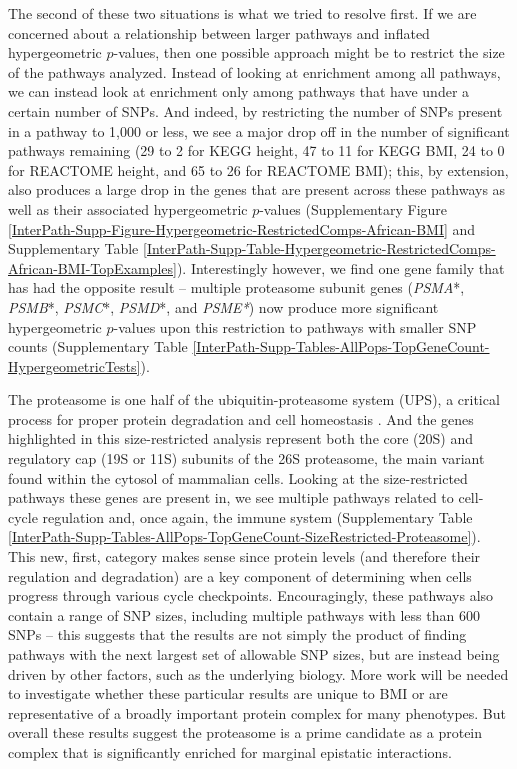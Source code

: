 \documentclass[12pt,a4paper]{article}
\begin{document}
The second of these two situations is what we tried to resolve first. If we are concerned about a relationship between larger pathways and inflated hypergeometric $p$-values, then one possible approach might be to restrict the size of the pathways analyzed. Instead of looking at enrichment among all pathways, we can instead look at enrichment only among pathways that have under a certain number of SNPs. And indeed, by restricting the number of SNPs present in a pathway to 1,000 or less, we see a major drop off in the number of significant pathways remaining (29 to 2 for KEGG height, 47 to 11 for KEGG BMI, 24 to 0 for REACTOME height, and 65 to 26 for REACTOME BMI); this, by extension, also produces a large drop in the genes that are present across these pathways as well as their associated hypergeometric $p$-values (Supplementary Figure \ref{InterPath-Supp-Figure-Hypergeometric-RestrictedComps-African-BMI} and Supplementary Table \ref{InterPath-Supp-Table-Hypergeometric-RestrictedComps-African-BMI-TopExamples}). Interestingly however, we find one gene family that has had the opposite result -- multiple proteasome subunit genes (\textit{PSMA}*, \textit{PSMB}*, \textit{PSMC}*, \textit{PSMD}*, and \textit{PSME*}) now produce more significant hypergeometric $p$-values upon this restriction to pathways with smaller SNP counts (Supplementary Table \ref{InterPath-Supp-Tables-AllPops-TopGeneCount-HypergeometricTests}). 

The proteasome is one half of the ubiquitin-proteasome system (UPS), a critical process for proper protein degradation and cell homeostasis \citep{Voges1999,Livneh2016,Collins2017}. And the genes highlighted in this size-restricted analysis represent both the core (20S) and regulatory cap (19S or 11S) subunits of the 26S proteasome, the main variant found within the cytosol of mammalian cells. Looking at the size-restricted pathways these genes are present in, we see multiple pathways related to cell-cycle regulation and, once again, the immune system (Supplementary Table \ref{InterPath-Supp-Tables-AllPops-TopGeneCount-SizeRestricted-Proteasome}). This new, first, category makes sense since protein levels (and therefore their regulation and degradation) are a key component of determining when cells progress through various cycle checkpoints. Encouragingly, these pathways also contain a range of SNP sizes, including multiple pathways with less than 600 SNPs -- this suggests that the results are not simply the product of finding pathways with the next largest set of allowable SNP sizes, but are instead being driven by other factors, such as the underlying biology. More work will be needed to investigate whether these particular results are unique to BMI or are representative of a broadly important protein complex for many phenotypes. But overall these results suggest the proteasome is a prime candidate as a protein complex that is significantly enriched for marginal epistatic interactions.  
\end{document}
